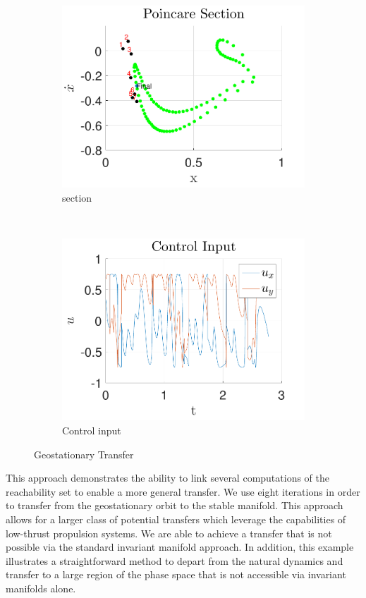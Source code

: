 \documentclass[preprint]{elsarticle}
\begin{document}
\begin{figure}
	\begin{subfigure}[htbp]{0.5\textwidth} 
		\includegraphics[width=\textwidth]{poincare} 
		\caption{\Poincare section} \label{fig:geo_transfer_poincare} 
	\end{subfigure}~%
	\begin{subfigure}[htbp]{0.5\textwidth} 
		\includegraphics[width=\textwidth]{control_input_geo} 
		\caption{Control input} \label{fig:control_input_geo} 
	\end{subfigure} 
	\caption{Geostationary Transfer}
	\label{fig:geo_transfer} 
\end{figure}

This approach demonstrates the ability to link several computations of the reachability set to enable a more general transfer.
We use eight iterations in order to transfer from the geostationary orbit to the stable manifold.
This approach allows for a larger class of potential transfers which leverage the capabilities of low-thrust propulsion systems.
We are able to achieve a transfer that is not possible via the standard invariant manifold approach. 
In addition, this example illustrates a straightforward method to depart from the natural dynamics and transfer to a large region of the phase space that is not accessible via invariant manifolds alone.
\end{document}
